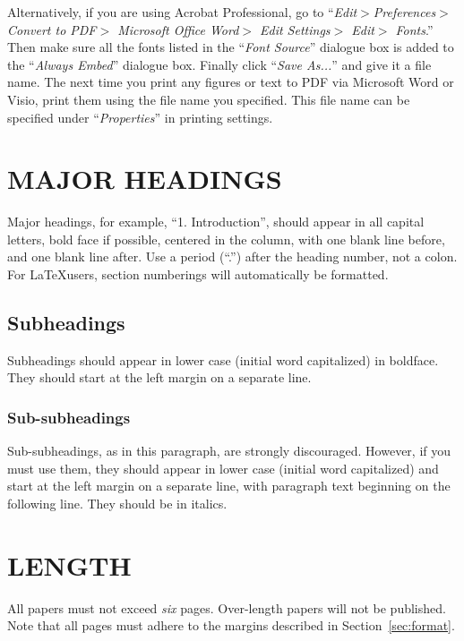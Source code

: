 \documentclass{article}
\begin{document}
Alternatively, if you are using Acrobat Professional, go to
``\emph{Edit$>$Preferences$>$Convert to PDF$>$ Microsoft Office
Word$>$ Edit Settings$>$ Edit$>$ Fonts}.'' Then make sure all the
fonts listed in the ``\emph{Font Source}'' dialogue box is added to
the ``\emph{Always Embed}'' dialogue box. Finally click ``\emph{Save
As...}'' and give it a file name. The next time you print any
figures or text to PDF via Microsoft Word or Visio, print them using
the file name you specified. This file name can be specified under
``\emph{Properties}'' in printing settings.



\section{MAJOR HEADINGS}
\label{sec:majhead}

Major headings, for example, ``1. Introduction'', should appear in
all capital letters, bold face if possible, centered in the column,
with one blank line before, and one blank line after. Use a period
(``.'') after the heading number, not a colon. For \LaTeX users,
section numberings will automatically be formatted.

\subsection{Subheadings}
\label{ssec:subhead}

Subheadings should appear in lower case (initial word capitalized) in
boldface.  They should start at the left margin on a separate line.

\subsubsection{Sub-subheadings}
\label{sssec:subsubhead}

Sub-subheadings, as in this paragraph, are strongly discouraged.
However, if you must use them, they should appear in lower case
(initial word capitalized) and start at the left margin on a
separate line, with paragraph text beginning on the following line.
They should be in italics.


\section{LENGTH}
\label{sec:length}

All papers must not exceed \emph{six} pages. Over-length papers will
not be published. Note that all pages must adhere to the margins
described in Section~\ref{sec:format}.
\end{document}
